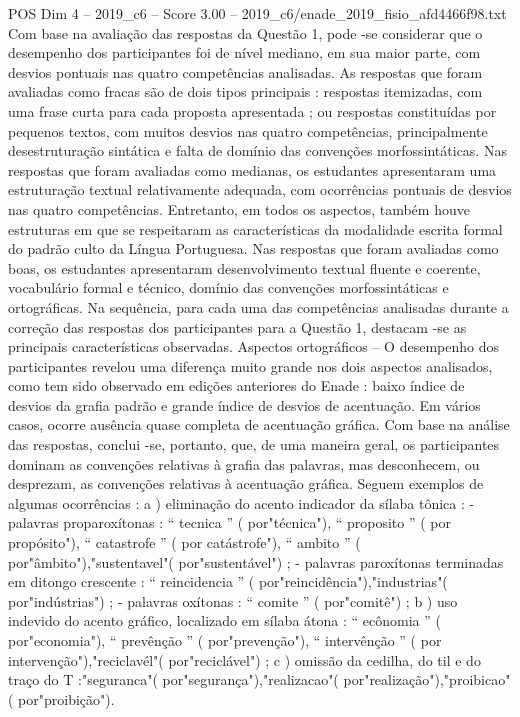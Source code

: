 \begin{textsample}{POS Dim 4 – 2019\_c6 – Score 3.00 – 2019\_c6/enade\_2019\_fisio\_afd4466f98.txt}
Com base na avaliação das respostas da Questão 1, pode -se considerar que o desempenho dos participantes foi de nível mediano, em sua maior parte, com desvios pontuais nas quatro competências analisadas.
As respostas que foram avaliadas como fracas são de dois tipos principais : respostas itemizadas, com uma frase curta para cada proposta apresentada ; ou respostas constituídas por pequenos textos, com muitos desvios nas quatro competências, principalmente desestruturação sintática e falta de domínio das convenções morfossintáticas.
Nas respostas que foram avaliadas como medianas, os estudantes apresentaram uma estruturação textual relativamente adequada, com ocorrências pontuais de desvios nas quatro competências.
Entretanto, em todos os aspectos, também houve estruturas em que se respeitaram as características da modalidade escrita formal do padrão culto da Língua Portuguesa.
Nas respostas que foram avaliadas como boas, os estudantes apresentaram desenvolvimento textual fluente e coerente, vocabulário formal e técnico, domínio das convenções morfossintáticas e ortográficas.
Na sequência, para cada uma das competências analisadas durante a correção das respostas dos participantes para a Questão 1, destacam -se as principais características observadas.
Aspectos ortográficos – O desempenho dos participantes revelou uma diferença muito grande nos dois aspectos analisados, como tem sido observado em edições anteriores do Enade : baixo índice de desvios da grafia padrão e grande índice de desvios de acentuação.
Em vários casos, ocorre ausência quase completa de acentuação gráfica.
Com base na análise das respostas, conclui -se, portanto, que, de uma maneira geral, os participantes dominam as convenções relativas à grafia das palavras, mas desconhecem, ou desprezam, as convenções relativas à acentuação gráfica.
Seguem exemplos de algumas ocorrências : a ) eliminação do acento indicador da sílaba tônica : - palavras proparoxítonas : “ tecnica ” ( por"técnica"), “ proposito ” ( por propósito"), “ catastrofe ” ( por catástrofe"), “ ambito ” ( por"âmbito"),"sustentavel"( por"sustentável") ; - palavras paroxítonas terminadas em ditongo crescente : “ reincidencia ” ( por"reincidência"),"industrias"( por"indústrias") ; - palavras oxítonas : “ comite ” ( por"comitê") ; b ) uso indevido do acento gráfico, localizado em sílaba átona : “ ecônomia ” ( por"economia"), “ prevênção ” ( por"prevenção"), “ intervênção ” ( por intervenção"),"reciclavél"( por"reciclável") ; c ) omissão da cedilha, do til e do traço do T :"seguranca"( por"segurança"),"realizacao"( por"realização"),"proibicao"( por"proibição").

\end{textsample}
